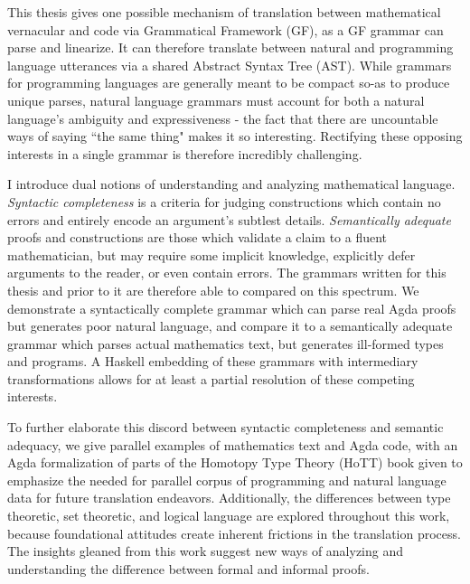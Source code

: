 \documentclass[11pt, a4paper]{article}
\begin{document}
This thesis gives one possible mechanism of translation between mathematical
vernacular and code via Grammatical Framework (GF), as a GF grammar can parse
and linearize. It can therefore translate between natural and programming
language utterances via a shared Abstract Syntax Tree (AST). While grammars for
programming languages are generally meant to be compact so-as to produce unique
parses, natural language grammars must account for both a natural language's
ambiguity and expressiveness - the fact that there are uncountable ways of
saying ``the same thing" makes it so interesting. Rectifying these opposing
interests in a single grammar is therefore incredibly challenging.

I introduce dual notions of understanding and analyzing mathematical language.
\emph{Syntactic completeness} is a criteria for judging constructions which
contain no errors and entirely encode an argument's subtlest details.
\emph{Semantically adequate} proofs and constructions are those which validate a
claim to a fluent mathematician, but may require some implicit knowledge,
explicitly defer arguments to the reader, or even contain errors. The grammars
written for this thesis and prior to it are therefore able to compared on this
spectrum. We demonstrate a syntactically complete grammar which can parse real
Agda proofs but generates poor natural language, and compare it to a
semantically adequate grammar which parses actual mathematics text, but
generates ill-formed types and programs. A Haskell embedding of these grammars
with intermediary transformations allows for at least a partial resolution of
these competing interests.

To further elaborate this discord between syntactic completeness and semantic
adequacy, we give parallel examples of mathematics text and Agda code,
with an Agda formalization of parts of the Homotopy Type Theory (HoTT) book
given to emphasize the needed for parallel corpus of programming and natural
language data for future translation endeavors. Additionally, the differences
between type theoretic, set theoretic, and logical language are explored
throughout this work, because foundational attitudes create inherent frictions
in the translation process. The insights gleaned from this work suggest new ways of
analyzing and understanding the difference between formal and informal proofs.

\thispagestyle{empty}

\newpage
\end{document}
